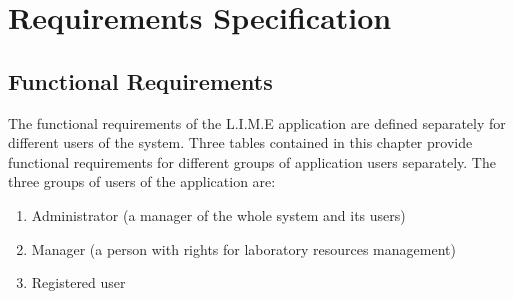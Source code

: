 \documentclass[a4paper,11pt,twoside]{report}
\theoremstyle{definition}
\begin{document}

\chapter{Requirements Specification}



\section{Functional Requirements}


The functional requirements of the L.I.M.E application are defined separately for different users of the system. Three tables contained in this chapter provide functional requirements for different groups of application users separately.
The three groups of users of the application are:
\begin{enumerate}

\item Administrator (a manager of the whole system and its users)
\item Manager (a person with rights for laboratory resources management)
\item Registered user

\end{enumerate}
\end{document}
